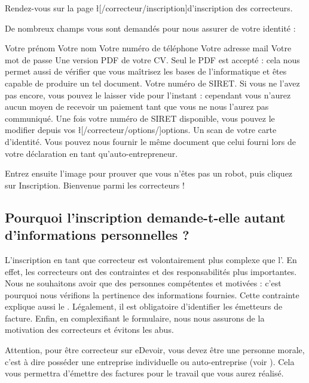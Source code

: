 ﻿Rendez-vous sur la page \l[/correcteur/inscription]{d'inscription des correcteurs}.

De nombreux champs vous sont demandés pour nous assurer de votre identité :
\begin{itemize}
\li Votre prénom
\li Votre nom
\li Votre numéro de téléphone
\li Votre adresse mail
\li Votre mot de passe
\li Une version PDF de votre CV.  Seul le PDF est accepté : cela nous permet aussi de vérifier que vous maîtrisez les bases de l'informatique et êtes capable de produire un tel document.
\li Votre numéro de SIRET.  Si vous ne l'avez pas encore, vous pouvez le laisser vide pour l'instant : cependant vous n'aurez aucun moyen de recevoir un paiement tant que vous ne nous l'aurez pas communiqué. Une fois votre numéro de SIRET disponible, vous pouvez le modifier depuis vos \l[/correcteur/options/]{options}.
\li Un scan de votre carte d'identité. Vous pouvez nous fournir le même document que celui fourni lors de votre déclaration en tant qu'auto-entrepreneur.
\end{itemize}

Entrez ensuite l'image pour prouver que vous n'êtes pas un robot, puis cliquez sur Inscription. Bienvenue parmi les correcteurs !

\subsection{Pourquoi l'inscription demande-t-elle autant d'informations personnelles ?}
L'inscription en tant que correcteur est volontairement plus complexe que l'. En effet, les correcteurs ont des contraintes et des responsabilités plus importantes. Nous ne souhaitons avoir que des personnes compétentes et motivées : c'est pourquoi nous vérifions la pertinence des informations fournies. Cette contrainte explique aussi le .
Légalement, il est obligatoire d'identifier les émetteurs de facture.
Enfin, en complexifiant le formulaire, nous nous assurons de la motivation des correcteurs et évitons les abus.

Attention, pour être correcteur sur eDevoir, vous devez être une personne morale, c'est à dire posséder une entreprise individuelle ou auto-entreprise (voir ). Cela vous permettra d'émettre des factures pour le travail que vous aurez réalisé.